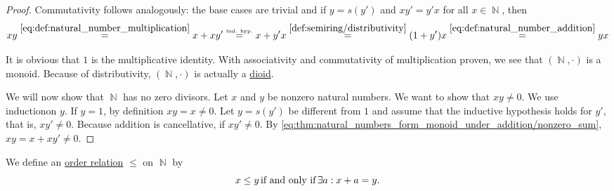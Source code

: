 \begin{proof}
   Commutativity follows analogously: the base cases are trivial and if \( y = s(y') \) and \( xy' = y'x \) for all \( x \in \BbbN \), then
  \begin{equation*}
    xy
    \overset{\eqref{eq:def:natural_number_multiplication}} =
    x + xy'
    \overset {\scriptscriptstyle{\text{ind. hyp.}}} =
    x + y'x
    \overset{\eqref{def:semiring/distributivity}} =
    (1 + y') x
    \overset{\eqref{eq:def:natural_number_addition}} =
    yx
  \end{equation*}

   It is obvious that \( 1 \) is the multiplicative identity. With associativity and commutativity of multiplication proven, we see that \( (\BbbN, \cdot) \) is a monoid. Because of distributivity, \( (\BbbN, \cdot) \) is actually a \hyperref[def:semiring/dioid]{dioid}.

  We will now show that \( \BbbN \) has no zero divisors. Let \( x \) and \( y \) be nonzero natural numbers. We want to show that \( xy \neq 0 \). We use induction\IND on \( y \). If \( y = 1 \), by definition \( xy = x \neq 0 \). Let \( y = s(y') \) be different from \( 1 \) and assume that the inductive hypothesis holds for \( y' \), that is, \( xy' \neq 0 \). Because addition is cancellative, if \( xy' \neq 0 \). By \eqref{eq:thm:natural_numbers_form_monoid_under_addition/nonzero_sum}, \( xy = x + xy' \neq 0 \).
\end{proof}

\begin{definition}\label{def:natural_number_ordering}
  We define an \hyperref[def:preordered_set]{order relation} \( \leq \) on \( \BbbN \) by
  \begin{equation*}
    x \leq y \mathop{\text{if and only if}} \exists a: x + a = y.
  \end{equation*}
\end{definition}


